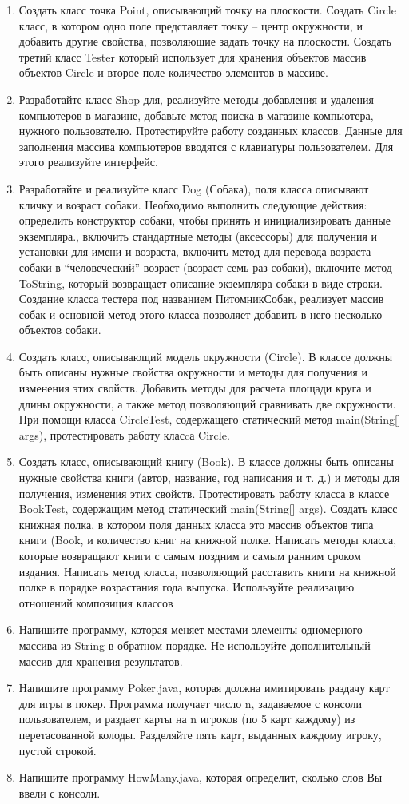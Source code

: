 \documentclass[14pt, a4paper]{extarticle}
\begin{document}
\begin{enumerate}
\item Создать класс точка Point, описывающий точку на плоскости.
Создать Circle класс, в котором одно поле представляет точку – центр
окружности, и добавить другие свойства, позволяющие задать точку на
плоскости. Создать третий класс Tester который использует для хранения
объектов массив объектов Circle и второе поле количество элементов в
массиве. 
\item Разработайте класс Shop для, реализуйте методы добавления и
удаления компьютеров в магазине, добавьте метод поиска в магазине
компьютера, нужного пользователю. Протестируйте работу созданных
классов. Данные для заполнения массива компьютеров вводятся с
клавиатуры пользователем. Для этого реализуйте интерфейс.
\item Разработайте и реализуйте класс Dog (Собака), поля класса
описывают кличку и возраст собаки. Необходимо выполнить следующие
действия: определить конструктор собаки, чтобы принять и
инициализировать данные экземпляра., включить стандартные методы
(аксессоры) для получения и установки для имени и возраста, включить
метод для перевода возраста собаки в “человеческий” возраст (возраст семь
раз собаки), включите метод ToString, который возвращает описание 
экземпляра собаки в виде строки. Создание класса тестера под названием
ПитомникСобак, реализует массив собак и основной метод этого класса
позволяет добавить в него несколько объектов собаки.
\item Создать класс, описывающий модель окружности (Circle). В
классе должны быть описаны нужные свойства окружности и методы для
получения и изменения этих свойств. Добавить методы для расчета
площади круга и длины окружности, а также метод позволяющий
сравнивать две окружности. При помощи класса CircleTest, содержащего
статический метод main(String[] args), протестировать работу класcа Circle. 
\item Создать класс, описывающий книгу (Book). В классе должны
быть описаны нужные свойства книги (автор, название, год написания и т.
д.) и методы для получения, изменения этих свойств. Протестировать
работу класса в классе BookTest, содержащим метод статический
main(String[] args). Создать класс книжная полка, в котором поля данных
класса это массив объектов типа книги (Book, и количество книг на
книжной полке. Написать методы класса, которые возвращают книги с
самым поздним и самым ранним сроком издания. Написать метод класса,
позволяющий расставить книги на книжной полке в порядке возрастания
года выпуска. Используйте реализацию отношений композиция классов
\item Напишите программу, которая меняет местами элементы
одномерного массива из String в обратном порядке. Не используйте
дополнительный массив для хранения результатов. 
\item Напишите программу Poker.java, которая должна имитировать
раздачу карт для игры в покер. Программа получает число n, задаваемое с
консоли пользователем, и раздает карты на n игроков (по 5 карт каждому)
из перетасованной колоды. Разделяйте пять карт, выданных каждому
игроку, пустой строкой.
\item Напишите программу HowMany.java, которая определит,
сколько слов Вы ввели с консоли.
\end{enumerate}
\end{document}
